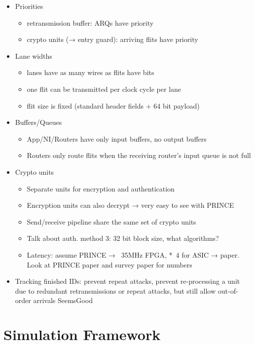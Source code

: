 \begin{itemize}
\begin{itemize}
        \end{itemize}
    \item Priorities
        \begin{itemize}
            \item retransmission buffer: ARQs have priority
            \item crypto units (→ entry guard): arriving flits have priority
        \end{itemize}
    \item Lane widths
        \begin{itemize}
            \item lanes have as many wires as flits have bits
            \item one flit can be transmitted per clock cycle per lane
            \item flit size is fixed (standard header fields + 64 bit payload)
        \end{itemize}
    \item Buffers/Queues
        \begin{itemize}
            \item App/NI/Routers have only input buffers, no output buffers
            \item Routers only route flits when the receiving router's input queue is not full
        \end{itemize}
    \item Crypto units
        \begin{itemize}
            \item Separate units for encryption and authentication
            \item Encryption units can also decrypt → very easy to see with PRINCE
            \item Send/receive pipeline share the same set of crypto units
            \item Talk about auth. method 3: 32 bit block size, what algorithms?
            \item Latency: assume PRINCE → ~35MHz FPGA, *~4 for ASIC → paper. Look at PRINCE paper and survey paper for numbers
        \end{itemize}
    \item Tracking finished IDs: prevent repeat attacks, prevent re-processing a unit due to redundant retransmissions or repeat attacks, but still
        allow out-of-order arrivals SeemsGood
\end{itemize}

\section{Simulation Framework}

